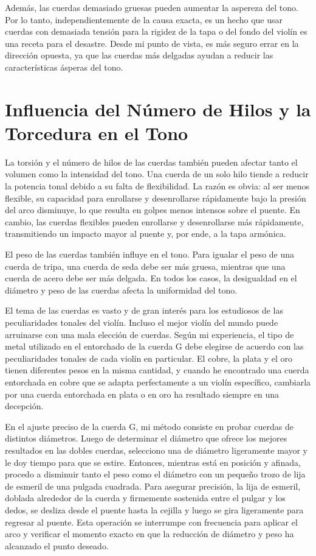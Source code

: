 \documentclass[12pt]{book}
\begin{document}
Además, las cuerdas demasiado gruesas pueden aumentar la aspereza del tono. Por lo tanto, independientemente de la causa exacta, es un hecho que usar cuerdas con demasiada tensión para la rigidez de la tapa o del fondo del violín es una receta para el desastre. Desde mi punto de vista, es más seguro errar en la dirección opuesta, ya que las cuerdas más delgadas ayudan a reducir las características ásperas del tono.

\section*{Influencia del Número de Hilos y la Torcedura en el Tono}

La torsión y el número de hilos de las cuerdas también pueden afectar tanto el volumen como la intensidad del tono. Una cuerda de un solo hilo tiende a reducir la potencia tonal debido a su falta de flexibilidad. La razón es obvia: al ser menos flexible, su capacidad para enrollarse y desenrollarse rápidamente bajo la presión del arco disminuye, lo que resulta en golpes menos intensos sobre el puente. En cambio, las cuerdas flexibles pueden enrollarse y desenrollarse más rápidamente, transmitiendo un impacto mayor al puente y, por ende, a la tapa armónica.

El peso de las cuerdas también influye en el tono. Para igualar el peso de una cuerda de tripa, una cuerda de seda debe ser más gruesa, mientras que una cuerda de acero debe ser más delgada. En todos los casos, la desigualdad en el diámetro y peso de las cuerdas afecta la uniformidad del tono.

El tema de las cuerdas es vasto y de gran interés para los estudiosos de las peculiaridades tonales del violín. Incluso el mejor violín del mundo puede arruinarse con una mala elección de cuerdas. Según mi experiencia, el tipo de metal utilizado en el entorchado de la cuerda G debe elegirse de acuerdo con las peculiaridades tonales de cada violín en particular. El cobre, la plata y el oro tienen diferentes pesos en la misma cantidad, y cuando he encontrado una cuerda entorchada en cobre que se adapta perfectamente a un violín específico, cambiarla por una cuerda entorchada en plata o en oro ha resultado siempre en una decepción. 

En el ajuste preciso de la cuerda G, mi método consiste en probar cuerdas de distintos diámetros. Luego de determinar el diámetro que ofrece los mejores resultados en las dobles cuerdas, selecciono una de diámetro ligeramente mayor y le doy tiempo para que se estire. Entonces, mientras está en posición y afinada, procedo a disminuir tanto el peso como el diámetro con un pequeño trozo de lija de esmeril de una pulgada cuadrada. Para asegurar precisión, la lija de esmeril, doblada alrededor de la cuerda y firmemente sostenida entre el pulgar y los dedos, se desliza desde el puente hasta la cejilla y luego se gira ligeramente para regresar al puente. Esta operación se interrumpe con frecuencia para aplicar el arco y verificar el momento exacto en que la reducción de diámetro y peso ha alcanzado el punto deseado. 
\end{document}
